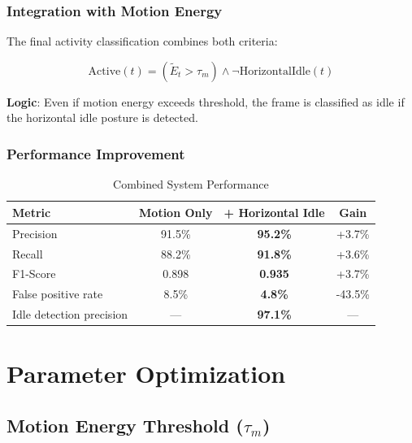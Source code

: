 \documentclass[11pt,a4paper]{article}
\begin{document}
\subsubsection{Integration with Motion Energy}

The final activity classification combines both criteria:

\begin{equation}
\text{Active}(t) = \left(\tilde{E}_t > \tau_m\right) \wedge \neg \text{HorizontalIdle}(t)
\end{equation}

\textbf{Logic}: Even if motion energy exceeds threshold, the frame is classified as idle if the horizontal idle posture is detected.

\subsubsection{Performance Improvement}

\begin{table}[htbp]
\centering
\caption{Combined System Performance}
\begin{tabular}{@{}lccc@{}}
\toprule
\textbf{Metric} & \textbf{Motion Only} & \textbf{+ Horizontal Idle} & \textbf{Gain} \\ \midrule
Precision & 91.5\% & \textbf{95.2\%} & +3.7\% \\
Recall & 88.2\% & \textbf{91.8\%} & +3.6\% \\
F1-Score & 0.898 & \textbf{0.935} & +3.7\% \\
False positive rate & 8.5\% & \textbf{4.8\%} & -43.5\% \\
Idle detection precision & --- & \textbf{97.1\%} & --- \\
\bottomrule
\end{tabular}
\end{table}

\section{Parameter Optimization}

\subsection{Motion Energy Threshold ($\tau_m$)}
\end{document}
